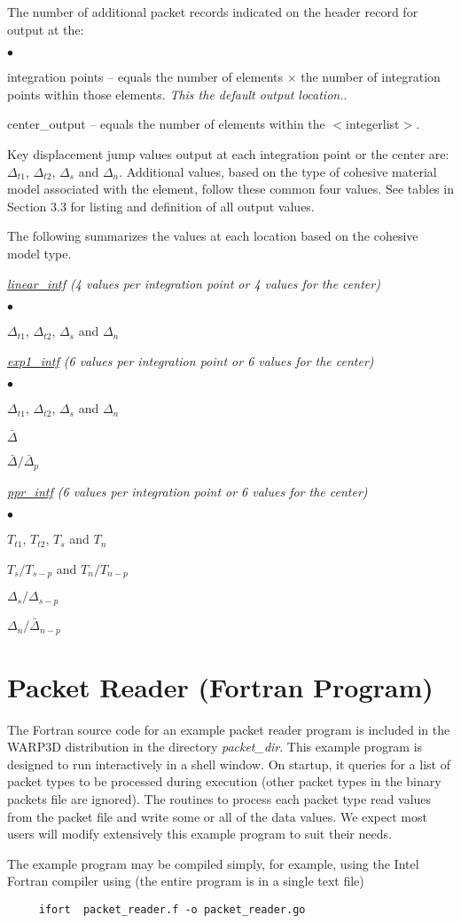 \documentclass[10pt]{report}
\numberwithin{equation}{section}
\newcommand{\ul} {\underline}
\newcommand{\ti}{\emph}
\newcommand{\squishlist}{
 \begin{list}{$\bullet$}
  { \setlength{\itemsep}{0pt}
     \setlength{\parsep}{3pt}
     \setlength{\topsep}{3pt}
     \setlength{\partopsep}{0pt}
     \setlength{\leftmargin}{1.5em}
     \setlength{\labelwidth}{1em}
     \setlength{\labelsep}{0.5em} } }
\newcommand{\squishend}{
  \end{list}  }
\begin{document}
\noindent The number of additional packet records indicated on the header 
record for output at the:
\squishlist
\item integration points -- equals the number of elements $\times$ the number of integration 
 points within those elements. \ti{This the default output location.}.
 \item center\_output --  equals the number of elements within the $<$integerlist$>$.
 \squishend

Key displacement jump values output at each integration point or the center are: $\Delta_{t1}$, 
$\Delta_{t2}$, $\Delta_s$ and $\Delta_n$.  Additional values, based on the type of cohesive 
material model associated with the element, follow these common four
values. See tables in Section 3.3 for listing and
definition of all output values. 

The following summarizes the values at each location 
based on the cohesive model type.


\noindent \ti{\ul{linear\_intf} (4 values per integration point or 4 values for the center)}

\squishlist
\item $\Delta_{t1}$,  $\Delta_{t2}$, $\Delta_s$ and $\Delta_n$
\squishend


\noindent \ti{\ul{exp1\_intf} (6 values per integration point or 6 values for the center)}

\squishlist
\item $\Delta_{t1}$,  $\Delta_{t2}$, $\Delta_s$ and $\Delta_n$
\item $\bar \Delta$
\item $\bar \Delta / \bar \Delta_p$
\squishend


\noindent \ti{\ul{ppr\_intf} (6 values per integration point or 6 values for the center)}

\squishlist
\item $T_{t1}$, $T_{t2}$, $T_s$ and $T_n$
\item $T_s/T_{s-p}$ and $T_n / T_{n-p}$
\item $\Delta_s / \Delta_{s-p}$
\item $\Delta_n / \bar \Delta_{n-p}$
\squishend


%
%
\section{Packet Reader (Fortran Program)}
The Fortran source code for an example packet reader program is included in the
WARP3D distribution in the directory \ti{packet\_dir}. This example
program is designed to run interactively in a shell window. On startup, it queries for
a list of packet types to be processed during execution (other packet types
in the binary packets file are ignored). The routines to process each
packet type read values from the packet file and write some or all of
the data values. We expect most users will modify extensively this example
program to suit their needs.

The example program may be compiled simply, for example, using the Intel Fortran 
compiler using (the entire program is in a single text file)
\begin{verbatim}
     ifort  packet_reader.f -o packet_reader.go
\end{verbatim}
\end{document}
